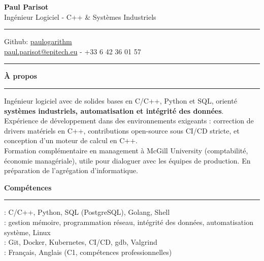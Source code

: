 \documentclass[9pt]{extarticle}
\begin{document}
\begin{center}
	{\huge\bfseries Paul Parisot}
	\\[4pt]
	{\Large Ingénieur Logiciel - C++ \& Systèmes Industriels}
	\\
\end{center}

\par\vspace{-5pt}
\rule{\linewidth}{0.4pt}
\par\vspace{-5pt}

\begin{center}
	Github: \href{https://github.com/paulogarithm}{paulogarithm}
	\\
	\href{mailto:paul.parisot@epitech.eu}{paul.parisot@epitech.eu} - +33 6 42 36 01 57
	\\
\end{center}

\par\vspace{-10pt}
\rule{\linewidth}{0.4pt}
\par\vspace{7pt}

{\large\bfseries À propos}
\par\vspace{-8pt}
\rule{\linewidth}{0.4pt}
\par\vspace{5pt}

Ingénieur logiciel avec de solides bases en C/C++, Python et SQL, orienté {\bfseries systèmes industriels, automatisation et intégrité des données}.
\\
Expérience de développement dans des environnements exigeants : correction de drivers matériels en C++, contributions open-source sous CI/CD stricte, et conception d'un moteur de calcul en C++.
\\
Formation complémentaire en management à McGill University (comptabilité, économie managériale), utile pour dialoguer avec les équipes de production. En préparation de l'agrégation d'informatique.
\par\vspace{5pt}

{\large\bfseries Compétences}
\par\vspace{-8pt}
\rule{\linewidth}{0.4pt}
\par\vspace{5pt}

\hspace*{5pt}{\bfseries Maîtrise}: C/C++, Python, SQL (PostgreSQL), Golang, Shell
\\
\hspace*{5pt}{\bfseries Systèmes \& Données}: gestion mémoire, programmation réseau, intégrité des données, automatisation système, Linux
\\
\hspace*{5pt}{\bfseries Outils}: Git, Docker, Kubernetes, CI/CD, gdb, Valgrind
\\
\hspace*{5pt}{\bfseries Langues}: Français, Anglais (C1, compétences professionnelles)
\end{document}
